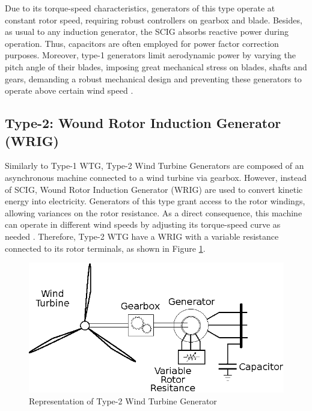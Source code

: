 Due to its torque-speed characteristics, generators of this type operate at constant rotor speed, requiring robust controllers on gearbox and blade. Besides, as usual to any induction generator, the SCIG absorbs reactive power during operation. Thus, capacitors are often employed for power factor correction purposes. Moreover, type-1 generators limit aerodynamic power by varying the pitch angle of their blades, imposing great mechanical stress on blades, shafts and gears, demanding a robust mechanical design and preventing these generators to operate above certain wind speed \cite{Ellis2011}. 

\subsection{Type-2: Wound Rotor Induction Generator (WRIG)}

Similarly to Type-1 WTG, Type-2 Wind Turbine Generators are composed of an asynchronous machine connected to a wind turbine via gearbox. However, instead of SCIG, Wound Rotor Induction Generator (WRIG) are used to convert kinetic energy into electricity. Generators of this type grant access to the rotor windings, allowing variances on the rotor resistance. As a direct consequence, this machine can operate in different wind speeds by adjusting its torque-speed curve as needed \cite{Ellis2011}. Therefore, Type-2 WTG have a WRIG with a variable resistance connected to its rotor terminals, as shown in Figure \ref{fig: WTG2}.

\begin{figure}[h]
	\caption{Representation of Type-2 Wind Turbine Generator}
	\begin{center}
		\includegraphics[scale=.8]{Images/Type2WTG.eps}
	\end{center}
	\label{fig: WTG2}
\end{figure}

